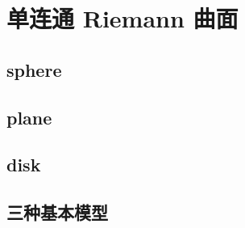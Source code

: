 \section{单连通 Riemann 曲面}
\label{b3:sec:1201}


\subsection{sphere}
\label{b3:subsec:120101}

\subsection{plane}
\label{b3:subsec:120102}

\subsection{disk}
\label{b3:subsec:120103}

\subsection{三种基本模型}
\label{b3:subsec:120104}


